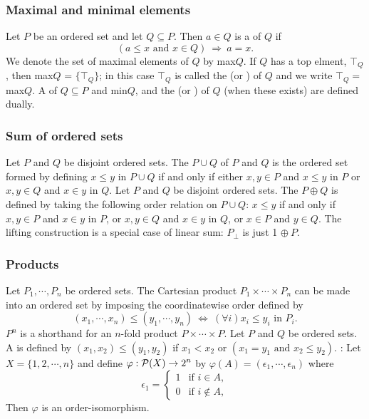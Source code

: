 \subsubsection{Maximal and minimal elements}
\bit
\w Let $P$ be an ordered set and let $Q \subseteq P$. Then $a \in Q$ is a
 of $Q$ if 
   \[ (\mbox{$a \le x$ and $x \in Q$})\ \Rightarrow\  a = x. \]
\w We denote the set of maximal elements of $Q$ by max$Q$.
\w If $Q$ has a top elment, $\top_Q$, then max$Q$ = $\{\top_Q\}$; in this case
$\top_Q$ is called the  (or ) 
of $Q$ and we write $\top_Q =$ max$Q$. 
\w A  of $Q \subseteq P$ and min$Q$, and the  (or ) of $Q$ (when these exists) are defined dually.
\eit

\subsubsection{Sum of ordered sets}
\bit
\w Let $P$ and $Q$ be disjoint ordered sets. The  $P \cup
Q$ of $P$ and $Q$ is the ordered set formed by defining $x \le y$ in $P \cup
Q$ if and only if either $x, y \in P$ and $x \le y$ in $P$ or $x, y \in Q$ and
$x \in y$ in $Q$.
\w Let $P$ and $Q$ be disjoint ordered sets. The  $P \oplus Q$
is defined by taking the following order relation on $P \cup Q$: $x \le y$ if
and only if
  \ben
  \w [(a)] $x, y \in P$ and $x \in y$ in $P$, or
  \w [(b)] $x, y \in Q$ and $x \in y$ in $Q$, or
  \w [(c)] $x \in P$ and $y \in Q$.
  \een
\w The lifting construction is a special case of linear sum: $P_\bot$ is just
\mbox{1} $\oplus\ P$.
\eit

\subsubsection{Products}
\bit
\w Let $P_1, \cdots, P_n$ be ordered sets. The Cartesian product $P_1 \times
\cdots \times P_n$ can be made into an ordered set by imposing the
coordinatewise order defined by
\[ (x_1, \cdots, x_n) \le (y_1, \cdots, y_n) \ \Leftrightarrow\ 
(\forall{i})x_i \le y_i \mbox{\ in\ } P_i.\]
\w $P^n$ is a shorthand for an $n$-fold product $P \times \cdots \times P$.
\w Let $P$ and $Q$ be ordered sets. A \bb{lexicographic order} is defined by
 $(x_1, x_2) \le (y_1, y_2)$ if $x_1 < x_2$ or
  $(x_1 = y_1 \mbox{\ and\ } x_2 \le y_2)$.
: Let $X = \{1, 2, \cdots, n\}$ and define $\varphi:
   {\cal{}P}(X) \rightarrow \mbox{2}^n$ by 
$\varphi(A) = (\epsilon_1, \cdots, \epsilon_n)$
  where
  \[ \epsilon_1 = \left\{\begin{array}{ll}
  1 & \mbox{if\ } i \in A,\\
  0 & \mbox{if\ } i \not\in A,
			 \end{array}\right.
  \]
 Then $\varphi$ is an order-isomorphism.
\eit

